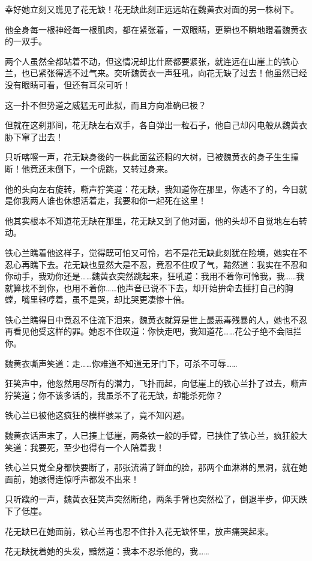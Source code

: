 \documentclass[12pt,oneside]{book}
\begin{document}
幸好她立刻又瞧见了花无缺！花无缺此刻正远远站在魏黄衣对面的另一株树下。

他全身每一根神经每一根肌肉，都在紧张着，一双眼睛，更瞬也不瞬地瞪着魏黄衣的一双手。

两个人虽然全都站着不动，但这情况却比什麽都要紧张，就连远在山崖上的铁心兰，也已紧张得透不过气来。突听魏黄衣一声狂吼，向花无缺了过去！他虽然已经没有眼睛可看，但还有耳朵可听！

这一扑不但势道之威猛无可此拟，而且方向准确已极？

但就在这刹那间，花无缺左右双手，各自弹出一粒石子，他自己却闪电般从魏黄衣胁下窜了出去！

只听喀嚓一声，花无缺身後的一株此面盆还粗的大树，已被魏黄衣的身子生生撞断！他竟还末倒下，一个虎跳，又转过身来。

他的头向左右旋转，嘶声狞笑道：花无缺，我知道你在那里，你逃不了的，今日就是你我两人谁也休想活着走，我要和你一起死在这里！

他其实根本不知道花无缺在那里，花无缺又到了他对面，他的头却不自觉地左右转动。

铁心兰瞧着他这样子，觉得既可怕又可怜，若不是花无缺此刻犹在险境，她实在不忍心再瞧下去。花无缺也显然大是不忍，竟忍不住叹了气，黯然道：我实在不忍和你动手，我劝你还是\ldots\ldots 魏黄衣突然跳起来，狂吼道：我用不着你可怜我，我\ldots\ldots 我就算找不到你，也用不着你\ldots\ldots 他声音已说不下去，却开始拚命去捶打自己的胸螳，嘴里轻哼着，虽不是哭，却比哭更凄惨十倍。

铁心兰瞧得目中竟忍不住流下泪来，魏黄衣就算是世上最恶毒残暴的人，她也不忍再看见他受这样的罪。她忍不住叹道：你快走吧，我知道花\ldots\ldots 花公子绝不会阻拦你。

魏黄衣嘶声笑道：走\ldots\ldots 你难道不知道无牙门下，可杀不可辱\ldots\ldots{}

狂笑声中，他忽然用尽所有的潜力，飞扑而起，向低崖上的铁心兰扑了过去，嘶声狞笑道；你不该多话的，我虽杀不了花无缺，却能杀死你？

铁心兰已被他这疯狂的模样骇呆了，竟不知闪避。

魏黄衣话声末了，人已揍上低崖，两条铁一般的手臂，已挟住了铁心兰，疯狂般大笑道：我要死，至少也得有一个人陪着我！

铁心兰只觉全身都快要断了，那张流满了鲜血的脸，那两个血淋淋的黑洞，就在她面前，她骇得连惊呼声都发不出来！

只听蹼的一声，魏黄衣狂笑声突然断绝，两条手臂也突然松了，倒退半步，仰天跌下了低崖。

花无缺已在她面前，铁心兰再也忍不住扑入花无缺怀里，放声痛哭起来。

花无缺抚着她的头发，黯然道：我本不忍杀他的，我\ldots\ldots{}
\end{document}
